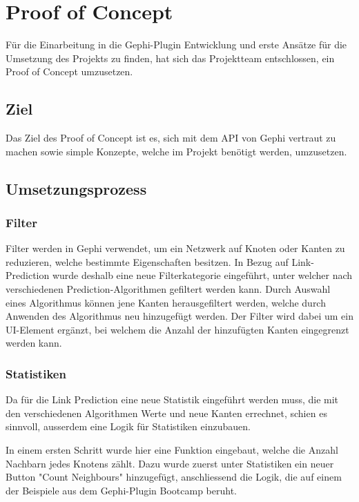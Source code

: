 \chapter{Proof of Concept}

Für die Einarbeitung in die Gephi-Plugin Entwicklung und erste Ansätze für die Umsetzung des Projekts zu finden, hat
sich das Projektteam entschlossen, ein Proof of Concept umzusetzen.

\section{Ziel}

Das Ziel des Proof of Concept ist es, sich mit dem API von Gephi vertraut zu machen sowie simple Konzepte, welche im
Projekt benötigt werden, umzusetzen.

\section{Umsetzungsprozess}

\subsection{Filter}

Filter werden in Gephi verwendet, um ein Netzwerk auf Knoten oder Kanten zu reduzieren, welche bestimmte Eigenschaften besitzen.
In Bezug auf Link-Prediction wurde deshalb eine neue Filterkategorie eingeführt, unter welcher nach verschiedenen Prediction-Algorithmen gefiltert werden kann.
Durch Auswahl eines Algorithmus können jene Kanten herausgefiltert werden, welche durch Anwenden des Algorithmus neu hinzugefügt werden.
Der Filter wird dabei um ein UI-Element ergänzt, bei welchem die Anzahl der hinzufügten Kanten eingegrenzt werden kann.

\subsection{Statistiken}

Da für die Link Prediction eine neue Statistik eingeführt werden muss, die mit den verschiedenen Algorithmen Werte und
neue Kanten errechnet, schien es sinnvoll, ausserdem eine Logik für Statistiken einzubauen.

In einem ersten Schritt wurde hier eine Funktion eingebaut, welche die Anzahl Nachbarn jedes Knotens zählt. Dazu wurde
zuerst unter Statistiken ein neuer Button "Count Neighbours" hinzugefügt, anschliessend die Logik, die auf einem der
Beispiele aus dem Gephi-Plugin Bootcamp beruht.

